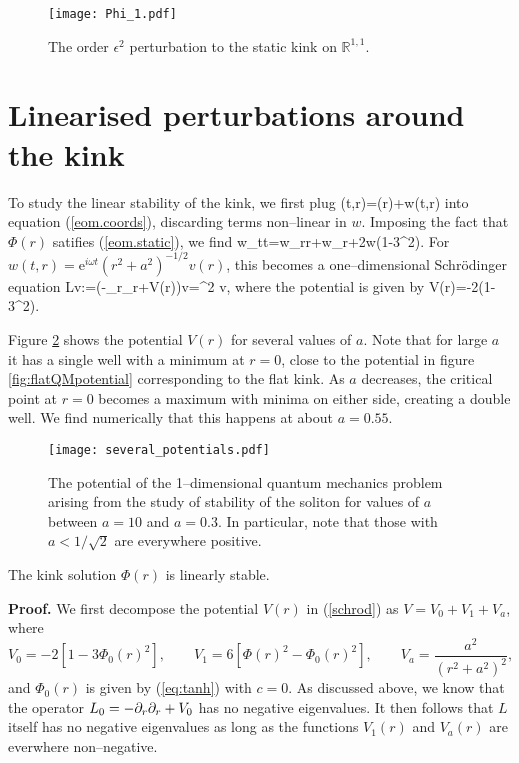\begin{figure}
\texttt{[image: Phi\_1.pdf]}
\caption{\label{fig:Phi_1}The order $\epsilon^2$ perturbation to the static kink on $\mathbb{R}^{1,1}$.}
\end{figure}


\section{Linearised perturbations around the kink}
\label{sec:linearised_pert}
To study the linear stability of the kink, we first plug
\be
\label{eq:pert}
\phi(t,r)=\Phi(r)+w(t,r)
\ee
into equation (\ref{eom.coords}), discarding terms non--linear in $w$. Imposing the fact that $\Phi(r)$ satifies (\ref{eom.static}), we find
\be
\nonumber
w_{tt}=w_{rr}+w_r+2w(1-3\Phi^2).
\ee
For $w(t,r)=\mathrm{e}^{i\omega t}(r^2+a^2)^{-1/2}v(r)$, this becomes a one--dimensional Schr\"odinger equation
\be
\label{schrod}
Lv:=(-\p_r\p_r+V(r))v=\omega^2 v,
\ee
where the potential is given by
\be
\label{QMpotential}
V(r)=-2(1-3\Phi^2).
\ee

Figure \ref{fig:several_potentials} shows the potential $V(r)$ for several values of $a$. Note that for large $a$ it has a single well with a minimum at $r=0$, close to the potential in figure \ref{fig:flatQMpotential} corresponding to the flat kink. As $a$ decreases, the critical point at $r=0$ becomes a maximum with minima on either side, creating a double well. We find numerically that this happens at about $a=0.55$.

\begin{figure}
\texttt{[image: several\_potentials.pdf]}
\caption{\label{fig:several_potentials}The potential of the 1--dimensional quantum mechanics problem arising from the study of stability of the soliton for values of $a$ between $a=10$ and $a=0.3$. In particular, note that those with $a<1/\sqrt{2}$ are everywhere positive.}
\end{figure}

\begin{prop}
The kink solution $\Phi(r)$ is linearly stable.
\end{prop} 

{\bf Proof.} We first decompose the potential $V(r)$ in (\ref{schrod}) as $V=V_0+V_1+V_a$, where
\[
V_0 = -2[1-3\Phi_0(r)^2],\qquad 
V_1 = 6[\Phi(r)^2-\Phi_0(r)^2],\qquad V_a = \frac{a^2}{(r^2+a^2)^2},
\]
and $\Phi_0(r)$ is given by (\ref{eq:tanh}) with $c=0$. As discussed above, we know that the operator $L_0 = -\partial_r\partial_r + V_0$ has no negative eigenvalues. It then follows that $L$ itself has no negative eigenvalues as long as the functions $V_1(r)$ and $V_a(r)$ are everwhere non--negative.

